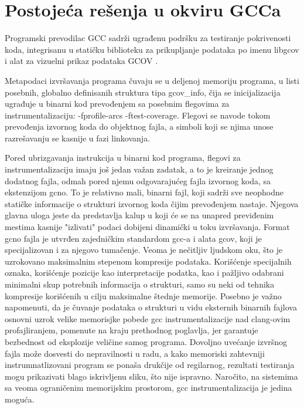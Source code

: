 \documentclass[12pt,oneside]{memoir}
\begin{document}
\section{Postojeća rešenja u okviru GCCa}


Programski prevodilac GCC sadrži ugrađenu podršku za testiranje pokrivenosti koda, integrisanu u statičku biblioteku za prikupljanje podataka po imenu libgcov i alat za vizuelni prikaz podataka GCOV \cite{GCOV} \cite{CodeCoverage}.


Metapodaci izvršavanja programa čuvaju se u deljenoj memoriju programa, u listi posebnih, globalno definisanih struktura tipa gcov\_info, čija se inicijalizacija ugrađuje u binarni kod prevođenjem sa posebnim flegovima za instrumentalizaciju: -fprofile-arcs -ftest-coverage. Flegovi se navode tokom prevođenja izvornog koda do objektnog fajla, a simboli koji se njima unose razrešavanju se kasnije u fazi linkovanja. 


Pored ubrizgavanja instrukcija u binarni kod programa, flegovi za instrumentalizaciju imaju još jedan važan zadatak, a to je kreiranje jednog dodatnog fajla, odmah pored njemu odgovarajućeg fajla izvornog koda, sa ekstenzijom gcno. To je relativno mali, binarni fajl, koji sadrži sve neophodne statičke informacije o strukturi izvornog koda čijim prevođenjem nastaje. Njegova glavna uloga jeste da predstavlja kalup u koji će se na unapred previđenim mestima kasnije "izlivati" podaci dobijeni dinamički u toku izvršavanja. Format gcno fajla je utvrđen zajedničkim standardom gcc-a i alata gcov, koji je specijalizovan i za njegovo tumačenje. Veoma je nečitljiv ljudskom oku, što je uzrokovano maksimalnim stepenom kompresije podataka. Korišćenje specijalnih oznaka, korišćenje pozicije kao interpretacije podatka, kao i pažljivo odabrani minimalni skup potrebnih informacija o strukturi, samo su neki od tehnika kompresije korišćenih u cilju maksimalne štednje memorije. Posebno je važno napomenuti, da je čuvanje podataka o strukturi u vidu eksternih binarnih fajlova osnovni uzrok velike memorisjke pobede gcc instrumentalizacije nad clang-ovim profajliranjem, pomenute na kraju prethodnog poglavlja, jer garantuje bezbednost od eksplozije veličine samog programa. Dovoljno uvećanje izvršnog fajla može dosvesti do nepravilnosti u radu, a kako memoriski zahtevniji instrumnatlizovani program se ponaša drukčije od regilarnog, rezultati testiranja mogu prikazivati blago iskrivljenu sliku, što nije ispravno. Naročito, na sistemima sa veoma ograničenim memorijskim prostorom, gcc instrumentalizacija je jedina moguća. 
\end{document}
